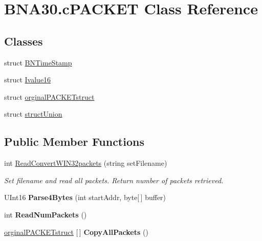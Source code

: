\hypertarget{class_b_n_a30_1_1c_p_a_c_k_e_t}{}\section{B\+N\+A30.\+c\+P\+A\+C\+K\+ET Class Reference}
\label{class_b_n_a30_1_1c_p_a_c_k_e_t}
\subsection*{Classes}
\begin{DoxyCompactItemize}
\item 
struct \mbox{\hyperlink{struct_b_n_a30_1_1c_p_a_c_k_e_t_1_1_b_n_time_stamp}{B\+N\+Time\+Stamp}}
\item 
struct \mbox{\hyperlink{struct_b_n_a30_1_1c_p_a_c_k_e_t_1_1_ivalue16}{Ivalue16}}
\item 
struct \mbox{\hyperlink{struct_b_n_a30_1_1c_p_a_c_k_e_t_1_1orginal_p_a_c_k_e_tstruct}{orginal\+P\+A\+C\+K\+E\+Tstruct}}
\item 
struct \mbox{\hyperlink{struct_b_n_a30_1_1c_p_a_c_k_e_t_1_1struct_union}{struct\+Union}}
\end{DoxyCompactItemize}
\subsection*{Public Member Functions}
\begin{DoxyCompactItemize}
\item 
int \mbox{\hyperlink{class_b_n_a30_1_1c_p_a_c_k_e_t_aff189f3a0a80ce3a299f9c54480b63fe}{Read\+Convert\+W\+I\+N32packets}} (string set\+Filename)
\begin{DoxyCompactList}\small\item\em Set filename and read all packets. Return number of packets retrieved. \end{DoxyCompactList}\item 
\mbox{\label{class_b_n_a30_1_1c_p_a_c_k_e_t_ab00bf12bd6647045d4f6630906d711ba}} 
U\+Int16 {\bfseries Parse4\+Bytes} (int start\+Addr, byte\mbox{[}$\,$\mbox{]} buffer)
\item 
\mbox{\label{class_b_n_a30_1_1c_p_a_c_k_e_t_ae183ee0e194d455067611efc9a273b80}} 
int {\bfseries Read\+Num\+Packets} ()
\item 
\mbox{\label{class_b_n_a30_1_1c_p_a_c_k_e_t_a4092a316938b67af68958b26a5484718}} 
\mbox{\hyperlink{struct_b_n_a30_1_1c_p_a_c_k_e_t_1_1orginal_p_a_c_k_e_tstruct}{orginal\+P\+A\+C\+K\+E\+Tstruct}} \mbox{[}$\,$\mbox{]} {\bfseries Copy\+All\+Packets} ()
\end{DoxyCompactItemize}

